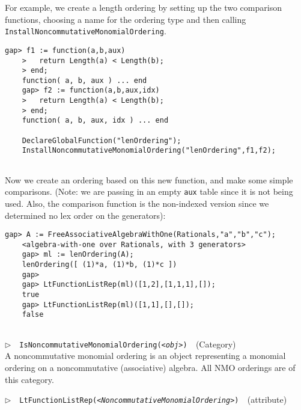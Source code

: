 \documentclass[a4paper,11pt]{report}
\begin{document}
{{{ For example, we create a length ordering by setting up the two comparison
functions, choosing a name for the ordering type and then calling \texttt{InstallNoncommutativeMonomialOrdering}. 
\begin{Verbatim}[commandchars=!@|,fontsize=\small,frame=single,label=Example]
    gap> f1 := function(a,b,aux)
    >   return Length(a) < Length(b);
    > end;
    function( a, b, aux ) ... end
    gap> f2 := function(a,b,aux,idx)
    >   return Length(a) < Length(b);
    > end;
    function( a, b, aux, idx ) ... end
    
    DeclareGlobalFunction("lenOrdering");
    InstallNoncommutativeMonomialOrdering("lenOrdering",f1,f2);
    
\end{Verbatim}
 Now we create an ordering based on this new function, and make some simple
comparisons. (Note: we are passing in an empty \texttt{aux} table since it is not being used. Also, the comparison function is the
non-indexed version since we determined no lex order on the generators): 
\begin{Verbatim}[commandchars=!@|,fontsize=\small,frame=single,label=Example]
    gap> A := FreeAssociativeAlgebraWithOne(Rationals,"a","b","c");
    <algebra-with-one over Rationals, with 3 generators>
    gap> ml := lenOrdering(A);
    lenOrdering([ (1)*a, (1)*b, (1)*c ])
    gap>
    gap> LtFunctionListRep(ml)([1,2],[1,1,1],[]);
    true
    gap> LtFunctionListRep(ml)([1,1],[],[]);
    false
    
\end{Verbatim}
 

 \noindent\textcolor{FuncColor}{$\triangleright$\ \ \texttt{IsNoncommutativeMonomialOrdering({\mdseries\slshape {\textless}obj{\textgreater}})
\label{IsNoncommutativeMonomialOrdering}
}\hfill{\scriptsize (Category)}}\\


 A noncommutative monomial ordering is an object representing a monomial
ordering on a noncommutative (associative) algebra. All \textsf{NMO} orderings are of this category. 

 \noindent\textcolor{FuncColor}{$\triangleright$\ \ \texttt{LtFunctionListRep({\mdseries\slshape {\textless}NoncommutativeMonomialOrdering{\textgreater}})
\label{LtFunctionListRep}
}\hfill{\scriptsize (attribute)}}\\


}}}
\end{document}
